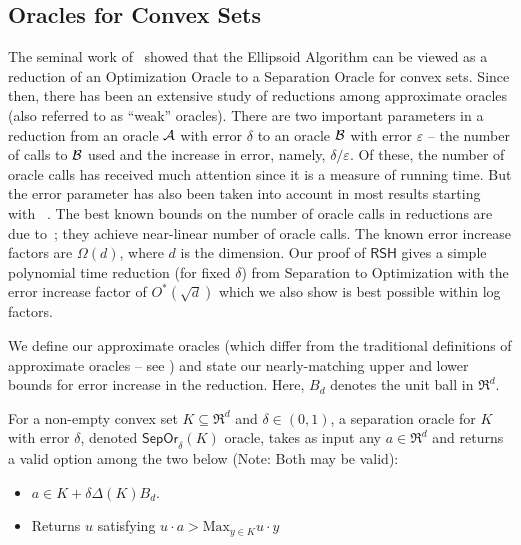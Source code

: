 \documentclass[11pt,letterpaper]{article}
\newcommand{\rsh}{{\mathsf {RSH}}\xspace}
\newcommand{\sep}{{\mathsf{SepOr}}}
\begin{document}
\noindent
\subsection{Oracles for Convex Sets} 
The seminal work of~\cite{GLS1988} showed that the Ellipsoid Algorithm can be viewed as a reduction of an Optimization Oracle 
to a Separation Oracle for convex sets. Since then, there has been an extensive study of reductions among approximate oracles (also referred to as ``weak'' oracles).
There are two important parameters in a reduction from an oracle ${\cal A}$ with error $\delta$ to an oracle ${\cal B}$ with error $\varepsilon$ --  the number of calls to ${\cal B}$ used and the increase in error, namely, $\delta/\varepsilon$. Of these, the number of oracle calls has received much attention
since it is a measure of running time.
But the error parameter has also been taken into account in most results starting with ~\cite{GLS1988}. The best known bounds on the number of oracle calls in reductions are due to~\cite{LeeSV18}; they achieve near-linear number of oracle calls. The known error increase factors are $\Omega(d)$, where $d$ is the dimension. Our proof of $\rsh$ gives a 
simple polynomial time reduction (for fixed $\delta$) from Separation to Optimization
with the error increase factor of $O^*(\sqrt d)$ which we also show is best possible within log factors.

We define our approximate oracles (which differ from the traditional definitions of approximate oracles --  see ) and state our nearly-matching upper and lower bounds for error increase in the reduction. Here, $B_d$ denotes the unit ball in $\Re^d$. 

\begin{defn}\label{defn-Sep}
For a non-empty convex set $K\subseteq\Re^d$ and $\delta\in (0,1)$, a separation oracle for $K$ with error $\delta$, denoted $\sep_\delta(K)$ oracle,  takes as input any $a\in \Re^d$ and returns a valid option among the two below (Note: Both may be valid):
\begin{itemize}
\item $a\in K+\delta \Delta (K) B_d$.
\item Returns $u$ satisfying
$u\cdot a >\mbox{Max}_{y\in K}u\cdot y$
\end{itemize} 
\end{defn}
\end{document}
